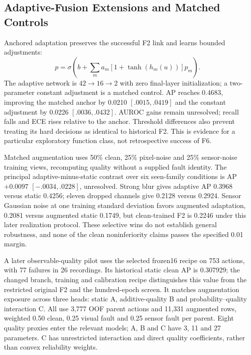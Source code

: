 \subsection{Adaptive-Fusion Extensions and Matched Controls}
Anchored adaptation preserves the successful F2 link and learns bounded adjustments:
\begin{equation}p=\sigma\!\left(b+\sum_m a_m[1+\tanh(h_m(u))]p_m\right).\end{equation}
The adaptive network is $42\rightarrow16\rightarrow2$ with zero final-layer
initialization; a two-parameter constant adjustment is a matched control. AP reaches
0.4683, improving the matched anchor by 0.0210 $[.0015,.0419]$ and the constant
adjustment by 0.0226 $[.0036,.0432]$. AUROC gains remain unresolved; recall falls and
ECE rises relative to the anchor. Threshold differences also prevent treating its hard
decisions as identical to historical F2. This is evidence for a particular exploratory
function class, not retrospective success of F6.

Matched augmentation uses 50\% clean, 25\% pixel-noise and 25\% sensor-noise training
views, recomputing quality without a supplied fault identity. The principal
adaptive-minus-static contrast over six seen-family conditions is AP $+0.0097$
$[-.0034,.0228]$, unresolved. Strong blur gives adaptive AP 0.3968 versus static 0.4256;
eleven dropped channels give 0.2128 versus 0.2924. Sensor Gaussian noise at one training
standard deviation favors augmented adaptation, 0.2081 versus augmented static 0.1749,
but clean-trained F2 is 0.2246 under this later realization protocol. These selective
wins do not establish general robustness, and none of the clean noninferiority claims
passes the specified 0.01 margin.

A later observable-quality pilot uses the selected frozen16 recipe on 753 actions, with
77 failures in 26 recordings. Its historical static clean AP is 0.307929; the changed
branch, training and calibration recipe distinguishes this value from the restricted
original F2 and the hundred-epoch screen. It matches augmentation exposure across three
heads: static A, additive-quality B and probability--quality interaction C. All use
3,777 OOF parent actions and 11,331 augmented rows, weighted 0.50 clean, 0.25 visual
fault and 0.25 sensor fault per parent. Eight quality proxies enter the relevant models;
A, B and C have 3, 11 and 27 parameters. C has unrestricted interaction and direct
quality coefficients, rather than convex reliability weights.

